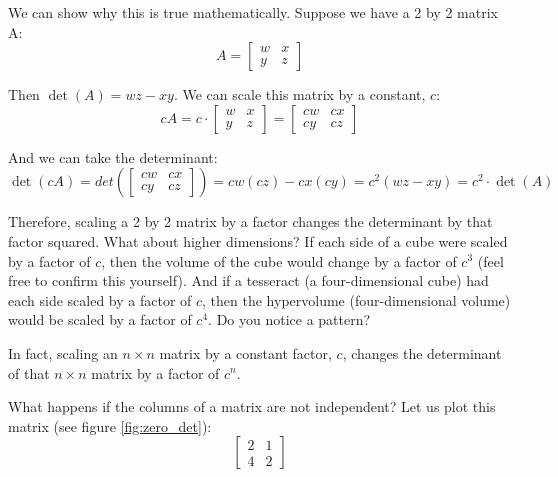 We can show why this is true mathematically. Suppose we have a 2 by 2 matrix A:
$$A = \begin{bmatrix}
w & x\\
y & z
\end{bmatrix}$$

Then $\det(A) = wz - xy$. We can scale this matrix by a constant, $c$:
$$cA = c \cdot \begin{bmatrix}
w & x\\
y & z
\end{bmatrix} = \begin{bmatrix}
cw & cx\\
cy & cz
\end{bmatrix}$$

And we can take the determinant:
$$\det(cA) = det \left( \begin{bmatrix}
cw & cx\\
cy & cz
\end{bmatrix} \right)= cw(cz) - cx(cy) = c^2 (wz - xy) = c^2 \cdot \det(A)$$

Therefore, scaling a 2 by 2 matrix by a factor changes the determinant by that 
factor squared. What about higher dimensions? If each side of a cube were 
scaled by a factor of $c$, then the volume of the cube would change by a 
factor of $c^3$ (feel free to confirm this yourself). And if a tesseract (a 
four-dimensional cube) had each side scaled by a factor of $c$, then the 
hypervolume (four-dimensional volume) would be scaled by a factor of $c^4$. Do 
you notice a pattern?

In fact, scaling an $n \times n$ matrix by a constant factor, $c$, changes the 
determinant of that $n \times n$ matrix by a factor of $c^n$. 

What happens if the columns of a matrix are not independent? Let us plot this 
matrix (see figure \ref{fig:zero_det}):
$$
\begin{bmatrix}
2 & 1  \\
4 & 2 
\end{bmatrix}
$$

